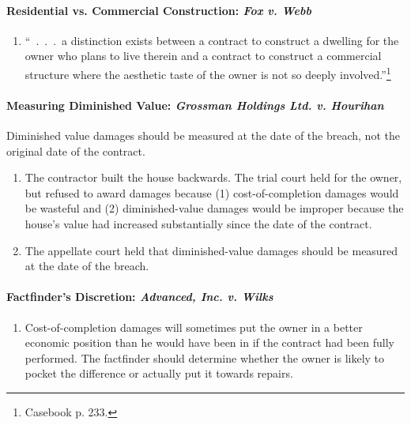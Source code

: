\paragraph{Residential vs. Commercial Construction: \emph{Fox v. Webb}}

\begin{enumerate}
    \item ``~.~.~.~a distinction exists between a contract to construct a 
    dwelling for the owner who plans to live therein and a contract to 
    construct a commercial structure where the aesthetic taste of the owner is 
    not so deeply involved.''\footnote{Casebook p. 233.}
\end{enumerate}

\paragraph{Measuring Diminished Value: \emph{Grossman Holdings Ltd. v. 
Hourihan}}

Diminished value damages should be measured at the date of the breach, not the 
original date of the contract.

\begin{enumerate}
    \item The contractor built the house backwards. The trial court held for 
    the owner, but refused to award damages because (1) cost-of-completion 
    damages would be wasteful and (2) diminished-value damages would be 
    improper because the house's value had increased substantially since the 
    date of the contract.
    \item The appellate court held that diminished-value damages should be 
    measured at the date of the breach.
\end{enumerate}

\paragraph{Factfinder's Discretion: \emph{Advanced, Inc. v. Wilks}}

\begin{enumerate}
    \item Cost-of-completion damages will sometimes put the owner in a better 
    economic position than he would have been in if the contract had been 
    fully performed. The factfinder should determine whether the owner is 
    likely to pocket the difference or actually put it towards repairs.
\end{enumerate}

